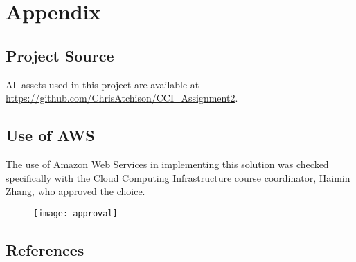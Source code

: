 



















\clearpage

\appendix

\section{Appendix}

\subsection{Project Source}

All assets used in this project are available at \url{https://github.com/ChrisAtchison/CCI_Assignment2}.

\subsection{Use of AWS}

The use of Amazon Web Services in implementing this solution was checked specifically with the Cloud Computing Infrastructure course coordinator, Haimin Zhang, who approved the choice.

\begin{figure}[H]
    \centering
    \texttt{[image: approval]}
\end{figure}

\subsection{References}

\printbibliography[heading=none]

